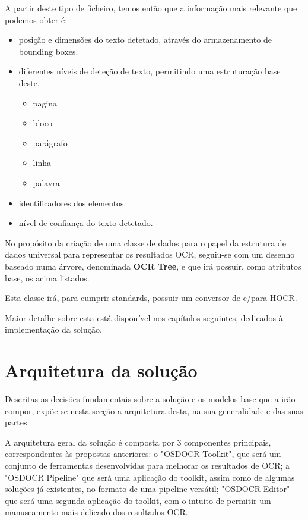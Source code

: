 A partir deste tipo de ficheiro, temos então que a informação mais relevante que podemos obter é:

\begin{itemize}\setlength\itemsep{-0.8em}
	\item posição e dimensões do texto detetado, através do armazenamento de bounding boxes.
	\item diferentes níveis de deteção de texto, permitindo uma estruturação base deste.
		\begin{itemize}\setlength\itemsep{-0.8em}
			\item pagina
			\item bloco
			\item parágrafo
			\item linha
			\item palavra
		\end{itemize}
	\item identificadores dos elementos.
	\item nível de confiança do texto detetado.
\end{itemize}

No propósito da criação de uma classe de dados para o papel da estrutura de dados universal para representar os resultados OCR, seguiu-se com um desenho baseado numa árvore, denominada \textbf{OCR Tree}, e que irá possuir, como atributos base, os acima listados.

Esta classe irá, para cumprir standards, possuir um conversor de e/para HOCR. 

Maior detalhe sobre esta está disponível nos capítulos seguintes, dedicados à implementação da solução.


\section{Arquitetura da solução}

Descritas as decisões fundamentais sobre a solução e os modelos base que a irão compor, expõe-se nesta secção a arquitetura desta, na sua generalidade e das suas partes.

A arquitetura geral da solução é composta por 3 componentes principais, correspondentes às propostas anteriores: o "OSDOCR Toolkit", que será um conjunto de ferramentas desenvolvidas para melhorar os resultados de OCR; a "OSDOCR Pipeline" que será uma aplicação do toolkit, assim como de algumas soluções já existentes, no formato de uma pipeline versátil; "OSDOCR Editor" que será uma segunda aplicação do toolkit, com o intuito de permitir um manuseamento mais delicado dos resultados OCR.

